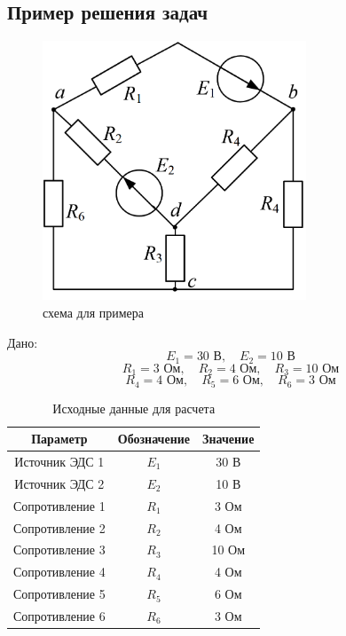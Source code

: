 \subsection{Пример решения задач}

\begin{figure}[H]
    \centering
    \includegraphics[width=0.7\textwidth]{images/30_task.png}
    \caption{схема для примера}
    \label{fig:example}
\end{figure}
Дано:
$$E_1 = 30 \text{ В}, \quad E_2 = 10 \text{ В}$$
$$R_1 = 3 \text{ Ом}, \quad R_2 = 4 \text{ Ом}, \quad R_3 = 10 \text{ Ом}$$
$$R_4 = 4 \text{ Ом}, \quad R_5 = 6 \text{ Ом}, \quad R_6 = 3 \text{ Ом}$$

\begin{table}[H]
\centering
\begin{tabular}{|c|c|c|}
\hline
\textbf{Параметр} & \textbf{Обозначение} & \textbf{Значение} \\
\hline
Источник ЭДС 1 & $E_1$ & 30 В \\
\hline
Источник ЭДС 2 & $E_2$ & 10 В \\
\hline
Сопротивление 1 & $R_1$ & 3 Ом \\
\hline
Сопротивление 2 & $R_2$ & 4 Ом \\
\hline
Сопротивление 3 & $R_3$ & 10 Ом \\
\hline
Сопротивление 4 & $R_4$ & 4 Ом \\
\hline
Сопротивление 5 & $R_5$ & 6 Ом \\
\hline
Сопротивление 6 & $R_6$ & 3 Ом \\
\hline
\end{tabular}
\caption{Исходные данные для расчета}
\label{tab:initial_data}
\end{table}

